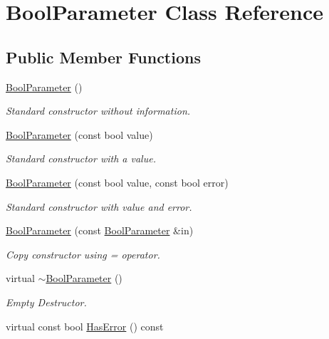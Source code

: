 \hypertarget{class_bool_parameter}{\section{Bool\-Parameter Class Reference}
\label{class_bool_parameter}
}
\subsection*{Public Member Functions}
\begin{DoxyCompactItemize}
\item 
\hyperlink{class_bool_parameter_adf6b711da9d2a89ea563c18063456ba4}{Bool\-Parameter} ()
\begin{DoxyCompactList}\small\item\em Standard constructor without information. \end{DoxyCompactList}\item 
\hyperlink{class_bool_parameter_ad71f979faed387cd7107cb6aaeb9d974}{Bool\-Parameter} (const bool value)
\begin{DoxyCompactList}\small\item\em Standard constructor with a value. \end{DoxyCompactList}\item 
\hyperlink{class_bool_parameter_a950a68f3877f07a3089224ba13c5215d}{Bool\-Parameter} (const bool value, const bool error)
\begin{DoxyCompactList}\small\item\em Standard constructor with value and error. \end{DoxyCompactList}\item 
\hyperlink{class_bool_parameter_a60cddb7b3fc1270cb79a238759744259}{Bool\-Parameter} (const \hyperlink{class_bool_parameter}{Bool\-Parameter} \&in)
\begin{DoxyCompactList}\small\item\em Copy constructor using = operator. \end{DoxyCompactList}\item 
virtual \hyperlink{class_bool_parameter_a385490fd59b6d27a9fb1ef63c2ff43bc}{$\sim$\-Bool\-Parameter} ()
\begin{DoxyCompactList}\small\item\em Empty Destructor. \end{DoxyCompactList}\item 
\hypertarget{class_bool_parameter_a25b8a4587ad9e01e3dcfc1ba9067f795}{virtual const bool \hyperlink{class_bool_parameter_a25b8a4587ad9e01e3dcfc1ba9067f795}{Has\-Error} () const }\label{class_bool_parameter_a25b8a4587ad9e01e3dcfc1ba9067f795}


\end{DoxyCompactItemize}
